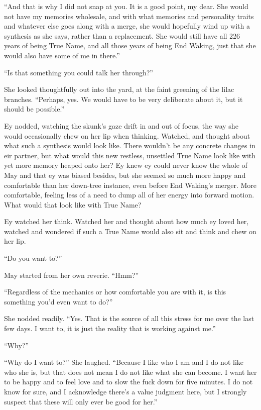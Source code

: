 ``And that is why I did not snap at you. It is a good point, my dear. She would not have my memories wholesale, and with what memories and personality traits and whatever else goes along with a merge, she would hopefully wind up with a synthesis as she says, rather than a replacement. She would still have all 226 years of being True Name, and all those years of being End Waking, just that she would also have some of me in there.''

``Is that something you could talk her through?''

She looked thoughtfully out into the yard, at the faint greening of the lilac branches. ``Perhaps, yes. We would have to be very deliberate about it, but it should be possible.''

Ey nodded, watching the skunk's gaze drift in and out of focus, the way she would occasionally chew on her lip when thinking. Watched, and thought about what such a synthesis would look like. There wouldn't be any concrete changes in eir partner, but what would this new restless, unsettled True Name look like with yet more memory heaped onto her? Ey knew ey could never know the whole of May and that ey was biased besides, but she seemed so much more happy and comfortable than her down-tree instance, even before End Waking's merger. More comfortable, feeling less of a need to dump all of her energy into forward motion. What would that look like with True Name?

Ey watched her think. Watched her and thought about how much ey loved her, watched and wondered if such a True Name would also sit and think and chew on her lip.

``Do you want to?''

May started from her own reverie. ``Hmm?''

``Regardless of the mechanics or how comfortable you are with it, is this something you'd even want to do?''

She nodded readily. ``Yes. That is the source of all this stress for me over the last few days. I want to, it is just the reality that is working against me.''

``Why?''

``Why do I want to?'' She laughed. ``Because I like who I am and I do not like who she is, but that does not mean I do not like what she can become. I want her to be happy and to feel love and to slow the fuck down for five minutes. I do not know for sure, and I acknowledge there's a value judgment here, but I strongly suspect that these will only ever be good for her.''

